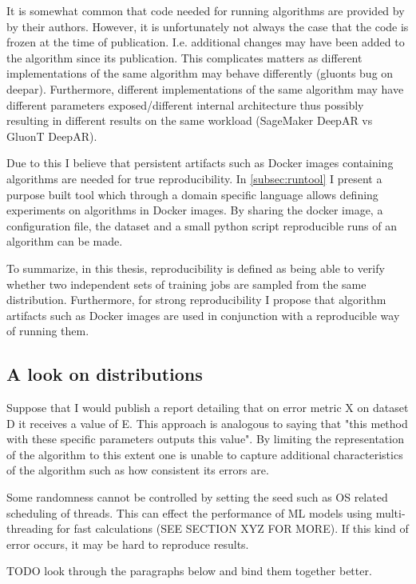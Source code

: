 It is somewhat common that code needed for running algorithms are provided by by their authors. However, it is unfortunately not always the case that the code is frozen at the time of publication. I.e. additional changes may have been added to the algorithm since its publication. This complicates matters as different implementations of the same algorithm may behave differently (gluonts bug on deepar). Furthermore, different implementations of the same algorithm may have different parameters exposed/different internal architecture thus possibly resulting in different results on the same workload (SageMaker DeepAR vs GluonT DeepAR). 

Due to this I believe that persistent artifacts such as Docker images containing algorithms are needed for true reproducibility. In \ref{subsec:runtool} I present a purpose built tool which through a domain specific language allows defining experiments on algorithms in Docker images. By sharing the docker image, a configuration file, the dataset and a small python script reproducible runs of an algorithm can be made. 

To summarize, in this thesis, reproducibility is defined as being able to verify whether two independent sets of training jobs are sampled from the same distribution. Furthermore, for strong reproducibility I propose that algorithm artifacts such as Docker images are used in conjunction with a reproducible way of running them.

\subsection{A look on distributions}
\label{subsec:distributions}
Suppose that I would publish a report detailing that on error metric X on dataset D it receives a value of E. This approach is analogous to saying that "this method with these specific parameters outputs this value". By limiting the representation of the algorithm to this extent one is unable to capture additional characteristics of the algorithm such as how consistent its errors are. 

Some randomness cannot be controlled by setting the seed such as OS related scheduling of threads. This can effect the performance of ML models using multi-threading for fast calculations (SEE SECTION XYZ FOR MORE). If this kind of error occurs, it may be hard to reproduce results. 

TODO look through the paragraphs below and bind them together better. 

